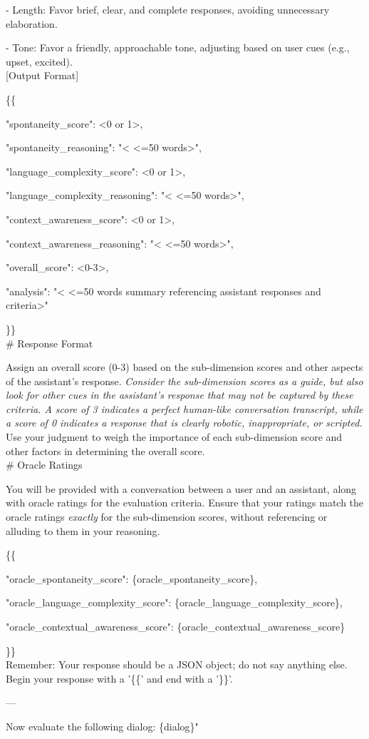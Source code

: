 \begin{tcolorbox}[gray_box, title = {{Prompt Template: GSRM for Speech Semantic Quality Training \& Inference }}]
- Length: Favor brief, clear, and complete responses, avoiding unnecessary elaboration. 

- Tone: Favor a friendly, approachable tone, adjusting based on user cues (e.g., upset, excited).\\


[Output Format]


\{\{

"spontaneity_score": <0 or 1>,

"spontaneity_reasoning": "< <=50 words>",

"language_complexity_score": <0 or 1>,

"language_complexity_reasoning": "< <=50 words>",

"context_awareness_score": <0 or 1>,

"context_awareness_reasoning": "< <=50 words>",

"overall_score": <0-3>,

"analysis": "< <=50 words summary referencing assistant responses and criteria>"

\}\}\\


\# Response Format


Assign an overall score (0-3) based on the sub-dimension scores and other aspects of the assistant's response. \textit{Consider the sub-dimension scores as a guide, but also look for other cues in the assistant's response that may not be captured by these criteria. A score of 3 indicates a perfect human-like conversation transcript, while a score of 0 indicates a response that is clearly robotic, inappropriate, or scripted.} Use your judgment to weigh the importance of each sub-dimension score and other factors in determining the overall score.\\


\# Oracle Ratings


You will be provided with a conversation between a user and an assistant, along with oracle ratings for the evaluation criteria. Ensure that your ratings match the oracle ratings \textit{exactly} for the sub-dimension scores, without referencing or alluding to them in your reasoning.


\{\{

"oracle_spontaneity_score": \{oracle_spontaneity_score\},  

"oracle_language_complexity_score": \{oracle_language_complexity_score\},   

"oracle_contextual_awareness_score": \{oracle_contextual_awareness_score\}

\}\}\\


Remember: Your response should be a JSON object; do not say anything else. Begin your response with a '\{\{' and end with a '\}\}'.

---

Now evaluate the following dialog: \{dialog\}"
\end{tcolorbox}